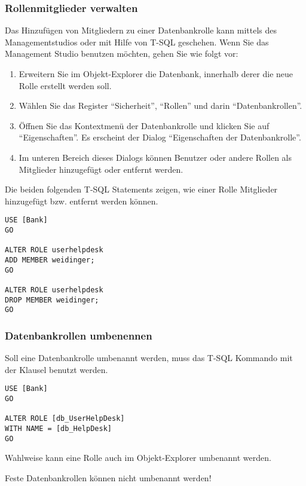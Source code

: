         \subsubsection{Rollenmitglieder verwalten}
          Das Hinzufügen von Mitgliedern zu einer Datenbankrolle kann mittels
          des Managementstudios oder mit Hilfe von T-SQL geschehen. Wenn Sie das
          Management Studio benutzen möchten, gehen Sie wie folgt vor:
          \begin{enumerate}
            \item Erweitern Sie im Objekt-Explorer die Datenbank, innerhalb
            derer die neue Rolle erstellt werden soll.
            \item Wählen Sie das Register \enquote{Sicherheit},
            \enquote{Rollen} und darin \enquote{Datenbankrollen}.
            \item Öffnen Sie das Kontextmenü der Datenbankrolle und klicken Sie
            auf \enquote{Eigenschaften}. Es erscheint der Dialog
            \enquote{Eigenschaften der Datenbankrolle}.
            \item Im unteren Bereich dieses Dialogs können Benutzer oder andere
            Rollen als Mitglieder hinzugefügt oder entfernt werden.
          \end{enumerate}
          Die beiden folgenden T-SQL Statements zeigen, wie einer Rolle
          Mitglieder hinzugefügt bzw. entfernt werden können.
          \begin{lstlisting}[language=ms_sql, caption={Ändern einer
           Datenbankrolle}, label=admin19_19]
USE [Bank]
GO

ALTER ROLE userhelpdesk
ADD MEMBER weidinger;
GO

ALTER ROLE userhelpdesk
DROP MEMBER weidinger;
GO
        \end{lstlisting}
        \subsubsection{Datenbankrollen umbenennen}
          Soll eine Datenbankrolle umbenannt werden, muss das T-SQL Kommando
           mit der Klausel 
          benutzt werden.
          \begin{lstlisting}[language=ms_sql, caption={Umbenennen einer
           Datenbankrolle}, label=admin19_20]
USE [Bank]
GO

ALTER ROLE [db_UserHelpDesk] 
WITH NAME = [db_HelpDesk]
GO
          \end{lstlisting}
          Wahlweise kann eine Rolle auch im Objekt-Explorer umbenannt werden.
          \begin{merke}
            Feste Datenbankrollen können nicht umbenannt werden!
          \end{merke}
          \begin{literaturinternet}
            \item \cite{ms189775}
          \end{literaturinternet}
